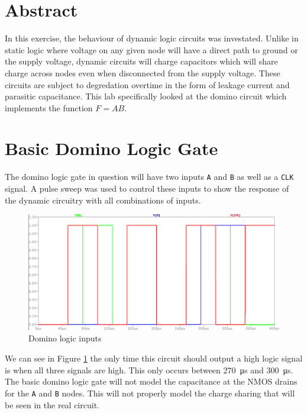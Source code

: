 \documentclass[CMPE]{../KGCOEReport}
\def\code#1{\texttt{#1}}
\begin{document}
    \maketitle
    \section*{Abstract}

	In this exercise, the behaviour of dynamic logic circuits was investated. Unlike
	in static logic where voltage on any given node will have a direct path to ground or
	the supply voltage, dynamic circuits will charge capacitors which will share charge
	across nodes even when disconnected from the supply voltage. These circuits are
	subject to degredation overtime in the form of leakage current and parasitic
	capacitance. This lab specifically looked at the domino circuit which implements 
	the function $F = AB$.

    \section*{Basic Domino Logic Gate}
    
	The domino logic gate in question will have two inputs \code{A} and \code{B} as
	well as a \code{CLK} signal. A pulse sweep was used to control these inputs to show
	the response of the dynamic circuitry with all combinations of inputs.
    
    \begin{figure}[h!]
       \centering
       \includegraphics[width=5.5in]{img/domino_inputs.png}
       \caption{Domino logic inputs}
       \label{fig:inputs}
	 \end{figure}

	We can see in Figure \ref{fig:inputs} the only time this circuit should output a high
	logic signal is when all three signals are high. This only occurs between
	\SI{270}{\micro\s} and \SI{300}{\micro\s}. The basic domino logic gate will not model
	the capacitance at the NMOS drains for the \code{A} and \code{B} nodes. This will not
	properly model the charge sharing that will be seen in the real circuit.
    
\end{document}
